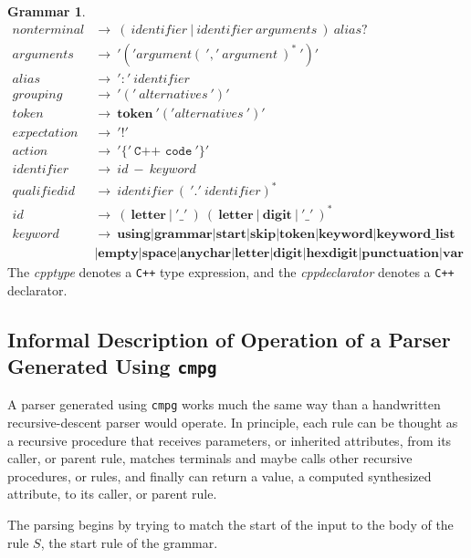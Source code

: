 \documentclass[a4paper,oneside,11pt]{book}
\theoremstyle{definition}
\newtheorem{grmr}{Grammar}[section]
\begin{document}
\begin{flushleft}
\begin{grmr}
\begin{align*}
nonterminal &\rightarrow \> (\> identifier \>| \> identifier \> arguments \>) \> alias?\\
arguments &\rightarrow \> '(' argument (\> ',' \> argument\>)^* \> ')'\\
alias &\rightarrow \> ':' \> identifier\\
grouping &\rightarrow \> '(' \> alternatives \> ')'\\
token &\rightarrow \> \textbf{token} \> '(' alternatives \> ')'\\
expectation &\rightarrow \> '!'\\
action &\rightarrow \> '\{' \> \texttt{C++ code} \> '\}'\\
identifier &\rightarrow \> id \> - \> keyword\\
qualifiedid &\rightarrow \> identifier \> ( \> '.' \> identifier)^*\\
id & \rightarrow \> ( \> \textbf{letter} \> | \> '\_' \> ) \> ( \> \textbf{letter} \> | \> \textbf{digit} \> | \> '\_' \> )^*\\
keyword &\rightarrow \> \textbf{using}|\textbf{grammar}|\textbf{start}|\textbf{skip}|\textbf{token}|\textbf{keyword}|\textbf{keyword\_list}\\
&|\textbf{empty}|\textbf{space}|\textbf{anychar}|\textbf{letter}|\textbf{digit}|\textbf{hexdigit}|\textbf{punctuation}|\textbf{var}
\end{align*}
The \emph{cpptype} denotes a \verb|C++| type expression, and the \emph{cppdeclarator} denotes a \verb|C++| declarator.
\end{grmr}
\end{flushleft}

\subsection{Informal Description of Operation of a Parser Generated Using \texttt{cmpg}}

A parser generated using \verb|cmpg| works much the same way than a handwritten recursive-descent parser would operate.
In principle, each rule can be thought as a recursive procedure that receives parameters, or inherited attributes, from its caller, or parent rule,
matches terminals and maybe calls other recursive procedures, or rules, and finally can return a value, a computed synthesized attribute,
to its caller, or parent rule.

The parsing begins by trying to match the start of the input to the body of the rule $S$, the start rule of the grammar.
\end{document}
